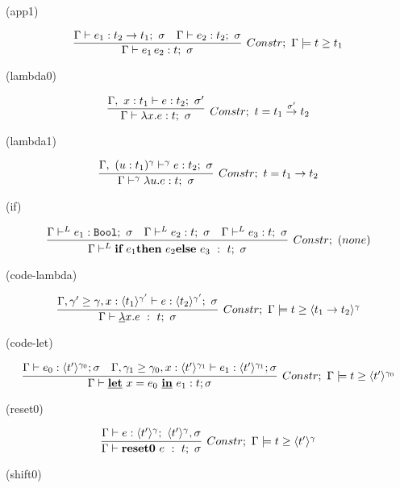(app1)

\[
  \infer[Constr;~\Gamma \models \longer{t}{t_1}]
  {\Gamma \vdash e_1 \, e_2 : t;~\sigma}
  {\Gamma \vdash e_1 : t_2 \to t_1;~\sigma
    &\Gamma \vdash e_2 : t_2;~\sigma
  }
\]

(lambda0)

\[
  \infer[Constr;~t=\funT{t_1}{t_2}{\sigma'}]
  {\Gamma \vdash \lambda x.e : t;~\sigma}
  {\Gamma,~x:t_1 \vdash e : t_2;~\sigma'}
\]

(lambda1)

\[
  \infer[Constr;~t=\funT{t_1}{t_2}{}]
  {\Gamma \vdash^\gamma \lambda u.e : t;~\sigma}
  {\Gamma,~(u:t_1)^\gamma \vdash^\gamma e : t_2;~\sigma}
\]

(if)

\[
  \infer[Constr;~(none)]
  {\Gamma \vdash^L
    \textbf{if}~e_1 \textbf{then}~e_2 \textbf{else}~e_3 ~:~t; ~ \sigma}
  {\Gamma \vdash^L e_1 : \Bool;~\sigma
    &\Gamma \vdash^L e_2 : t;~\sigma
    &\Gamma \vdash^L e_3 : t;~\sigma
  }
\]

(code-lambda)

\[
  \infer[Constr;~\Gamma \models \longer{t}{\codeT{t_1 \to t_2}{\gamma}}]
  {\Gamma \vdash \underline{\lambda}x.e ~:~t;~\sigma}
  {\Gamma,\longer{\gamma'}{\gamma},x:\codeT{t_1}{\gamma'}
    \vdash e : \codeT{t_2}{\gamma'};~\sigma
  }
\]

(code-let)

\[
  \infer[Constr;~\Gamma \models \longer{t}{\codeT{t'}{\gamma_0}}]
  {\Gamma \vdash \cLet~ x = e_0~ \cIn~ e_1 : t ; \sigma}
  { \Gamma \vdash e_0 : \codeT{t'}{\gamma_0} ; \sigma
    &\Gamma, \longer{\gamma_1}{\gamma_0}, x: \codeT{t'}{\gamma_1} \vdash e_1 : \codeT{t'}{\gamma_1} ; \sigma
  }
\]

(reset0)

\[
  \infer[Constr;~\Gamma \models \longer{t}{\codeT{t'}{\gamma}}]
  {\Gamma \vdash \Resetz~e ~:~ t; ~\sigma}
  {\Gamma \vdash e:\codeT{t'}{\gamma};~\codeT{t'}{\gamma},\sigma
  }
\]

(shift0)


